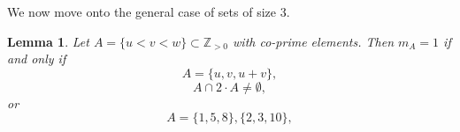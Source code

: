 \documentclass[12pt,reqno]{amsart}
\theoremstyle{dotless}
\newtheorem{lemma}{Lemma}
\begin{document}
%
%

We now move onto the general case of sets of size 3. 

\begin{lemma}\label{n3} Let $A  = \{u<v<w\} \subset \mathbb{Z}_{> 0}$ with co-prime elements. Then $m_A = 1$ if and only if
$$A = \{u,v,u+v\},$$
$$A \cap 2 \cdot A \neq \emptyset,$$
or 
$$A = \{1,5,8\} , \{2,3,10\},$$


\end{lemma}
\end{document}
